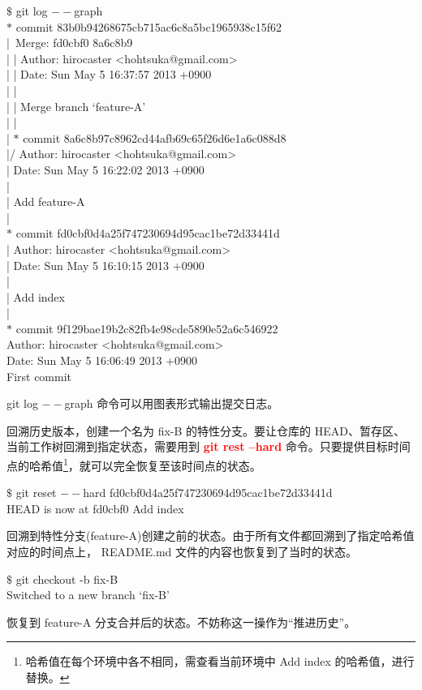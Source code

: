\documentclass[12pt,a4paper]{article}
\begin{document}
\begin{tcolorbox}[colback=green!5,colframe=green!40!black,title= ]
$\$$ git log $--$graph \\
$\ast$ commit 83b0b94268675cb715ac6c8a5bc1965938c15f62 \\
|\ Merge: fd0cbf0 8a6c8b9 \\
| | Author: hirocaster <hohtsuka@gmail.com> \\
| | Date: Sun May 5 16:37:57 2013 +0900 \\
| | \\
| | Merge branch `feature-A' \\
| | \\
| $\ast$ commit 8a6c8b97c8962cd44afb69c65f26d6e1a6c088d8 \\
|/ Author: hirocaster <hohtsuka@gmail.com> \\
| Date: Sun May 5 16:22:02 2013 +0900 \\
| \\
| Add feature-A \\
| \\
$\ast$ commit fd0cbf0d4a25f747230694d95cac1be72d33441d \\
| Author: hirocaster <hohtsuka@gmail.com> \\
| Date: Sun May 5 16:10:15 2013 +0900 \\
| \\
| Add index \\
| \\
$\ast$ commit 9f129bae19b2c82fb4e98cde5890e52a6c546922 \\
Author: hirocaster <hohtsuka@gmail.com> \\
Date: Sun May 5 16:06:49 2013 +0900 \\
First commit 
\end{tcolorbox}
git log $--$graph 命令可以用图表形式输出提交日志。

回溯历史版本，创建一个名为 fix-B 的特性分支。要让仓库的 HEAD、暂存区、当前工作树回溯到指定状态，需要用到 \textcolor{red}{\bf git rest --hard} 命令。只要提供目标时间点的哈希值\footnote{哈希值在每个环境中各不相同，需查看当前环境中 Add index 的哈希值，进行替换。}，就可以完全恢复至该时间点的状态。
\begin{tcolorbox}[colback=green!5,colframe=green!40!black,title= ]
$\$$ git reset $--$hard fd0cbf0d4a25f747230694d95cac1be72d33441d \\
HEAD is now at fd0cbf0 Add index
\end{tcolorbox}
回溯到特性分支(feature-A)创建之前的状态。由于所有文件都回溯到了指定哈希值对应的时间点上， README.md 文件的内容也恢复到了当时的状态。
\begin{tcolorbox}[colback=green!5,colframe=green!40!black,title= ]
$\$$ git checkout -b fix-B \\
Switched to a new branch `fix-B'
\end{tcolorbox}
恢复到 feature-A 分支合并后的状态。不妨称这一操作为“推进历史”。
\end{document}
